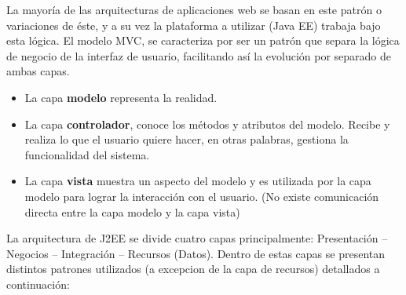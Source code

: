 \documentclass{memoria}
\begin{document}

La mayoría de las arquitecturas de aplicaciones web se basan en este patrón o variaciones de éste, y a su vez la plataforma a utilizar (Java EE) trabaja bajo esta lógica. El modelo MVC, se caracteriza por ser un patrón que separa la lógica de negocio de la interfaz de usuario, facilitando así la evolución por separado de ambas capas.

\begin{itemize}
\item La capa \textbf{modelo} representa la realidad.
\item La capa \textbf{controlador}, conoce los métodos y atributos del modelo. Recibe y realiza lo que el usuario quiere hacer, en otras palabras, gestiona la funcionalidad del sistema.
\item La capa \textbf{vista} muestra un aspecto del modelo y es utilizada por la capa modelo para lograr la interacción con el usuario. (No existe comunicación directa entre la capa modelo y la capa vista)
\end{itemize}



La arquitectura de J2EE se divide cuatro capas principalmente: Presentación – Negocios – Integración – Recursos (Datos). Dentro de estas capas se presentan distintos patrones utilizados (a excepcion de la capa de recursos) detallados a continuación:
\end{document}
